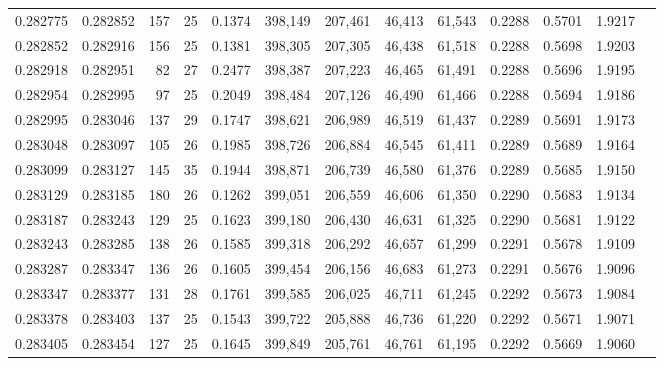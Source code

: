 \begin{tabular}{rrrrrrrrrrrrr}
0.282775 & 0.282852 &   157 &  25 &                                     0.1374 & 398,149 & 207,461 &  46,413 &  61,543 & 0.2288 & 0.5701 & 1.9217 \\
0.282852 & 0.282916 &   156 &  25 &                                     0.1381 & 398,305 & 207,305 &  46,438 &  61,518 & 0.2288 & 0.5698 & 1.9203 \\
0.282918 & 0.282951 &    82 &  27 &                                     0.2477 & 398,387 & 207,223 &  46,465 &  61,491 & 0.2288 & 0.5696 & 1.9195 \\
0.282954 & 0.282995 &    97 &  25 &                                     0.2049 & 398,484 & 207,126 &  46,490 &  61,466 & 0.2288 & 0.5694 & 1.9186 \\
0.282995 & 0.283046 &   137 &  29 &                                     0.1747 & 398,621 & 206,989 &  46,519 &  61,437 & 0.2289 & 0.5691 & 1.9173 \\
0.283048 & 0.283097 &   105 &  26 &                                     0.1985 & 398,726 & 206,884 &  46,545 &  61,411 & 0.2289 & 0.5689 & 1.9164 \\
0.283099 & 0.283127 &   145 &  35 &                                     0.1944 & 398,871 & 206,739 &  46,580 &  61,376 & 0.2289 & 0.5685 & 1.9150 \\
0.283129 & 0.283185 &   180 &  26 &                                     0.1262 & 399,051 & 206,559 &  46,606 &  61,350 & 0.2290 & 0.5683 & 1.9134 \\
0.283187 & 0.283243 &   129 &  25 &                                     0.1623 & 399,180 & 206,430 &  46,631 &  61,325 & 0.2290 & 0.5681 & 1.9122 \\
0.283243 & 0.283285 &   138 &  26 &                                     0.1585 & 399,318 & 206,292 &  46,657 &  61,299 & 0.2291 & 0.5678 & 1.9109 \\
0.283287 & 0.283347 &   136 &  26 &                                     0.1605 & 399,454 & 206,156 &  46,683 &  61,273 & 0.2291 & 0.5676 & 1.9096 \\
0.283347 & 0.283377 &   131 &  28 &                                     0.1761 & 399,585 & 206,025 &  46,711 &  61,245 & 0.2292 & 0.5673 & 1.9084 \\
0.283378 & 0.283403 &   137 &  25 &                                     0.1543 & 399,722 & 205,888 &  46,736 &  61,220 & 0.2292 & 0.5671 & 1.9071 \\
0.283405 & 0.283454 &   127 &  25 &                                     0.1645 & 399,849 & 205,761 &  46,761 &  61,195 & 0.2292 & 0.5669 & 1.9060 \\

\end{tabular}
